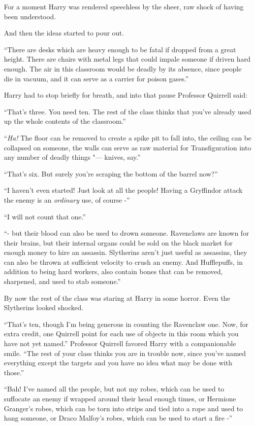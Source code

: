For a moment Harry was rendered speechless by the sheer, raw shock of
having been understood.

And then the ideas started to pour out.

``There are desks which are heavy enough to be fatal if dropped from a
great height. There are chairs with metal legs that could impale someone
if driven hard enough. The air in this classroom would be deadly by its
absence, since people die in vacuum, and it can serve as a carrier for
poison gases.''

Harry had to stop briefly for breath, and into that pause Professor
Quirrell said:

``That's three. You need ten. The rest of the class thinks that you've
already used up the whole contents of the classroom.''

``\emph{Ha!} The floor can be removed to create a spike pit to fall into,
the ceiling can be collapsed on someone, the walls can serve as raw
material for Transfiguration into any number of deadly things "--- knives,
say.''

``That's six. But surely you're scraping the bottom of the barrel now?''

``I haven't even started! Just look at all the people! Having a
Gryffindor attack the enemy is an \emph{ordinary} use, of course -''

``I will not count that one.''

``- but their blood can also be used to drown someone. Ravenclaws are
known for their brains, but their internal organs could be sold on the
black market for enough money to hire an assassin. Slytherins aren't
just useful as assassins, they can also be thrown at sufficient velocity
to crush an enemy. And Hufflepuffs, in addition to being hard workers,
also contain bones that can be removed, sharpened, and used to stab
someone.''

By now the rest of the class was staring at Harry in some horror. Even
the Slytherins looked shocked.

``That's ten, though I'm being generous in counting the Ravenclaw one.
Now, for extra credit, one Quirrell point for each use of objects in
this room which you have not yet named.'' Professor Quirrell favored
Harry with a companionable smile. ``The rest of your class thinks you
are in trouble now, since you've named everything except the targets and
you have no idea what may be done with those.''

``Bah! I've named all the people, but not my robes, which can be used to
suffocate an enemy if wrapped around their head enough times, or
Hermione Granger's robes, which can be torn into strips and tied into a
rope and used to hang someone, or Draco Malfoy's robes, which can be
used to start a fire -''

